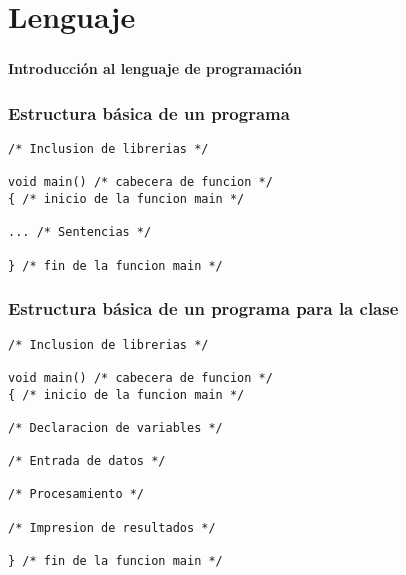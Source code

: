 \setlength{\parskip}{\baselineskip} 
\section*{Lenguaje}

\begin{frame}[c] 
\frametitle{}
\centering
\huge \textbf{Introducción al lenguaje de programación}
\end{frame}


\begin{frame}[t, fragile]
\frametitle{Estructura básica de un programa}
\begin{lstlisting}
/* Inclusion de librerias */

void main() /* cabecera de funcion */
{ /* inicio de la funcion main */

... /* Sentencias */

} /* fin de la funcion main */
\end{lstlisting}
\end{frame}


\begin{frame}[fragile]
\frametitle{Estructura básica de un programa para la clase}
\begin{lstlisting}
/* Inclusion de librerias */

void main() /* cabecera de funcion */
{ /* inicio de la funcion main */

/* Declaracion de variables */

/* Entrada de datos */

/* Procesamiento */

/* Impresion de resultados */

} /* fin de la funcion main */
\end{lstlisting}
\end{frame}


